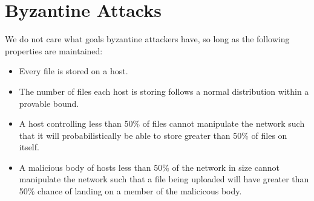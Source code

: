 \documentclass[twocolumn]{article}
\begin{document}
\section{Byzantine Attacks}
We do not care what goals byzantine attackers have, so long as the following properties are maintained:
\begin{itemize}
	\item Every file is stored on a host.
	\item The number of files each host is storing follows a normal distribution within a provable bound.
	\item A host controlling less than 50\% of files cannot manipulate the network such that it will probabilistically be able to store greater than 50\% of files on itself.
	\item A malicious body of hosts less than 50\% of the network in size cannot manipulate the network such that a file being uploaded will have greater than 50\% chance of landing on a member of the malicicous body.
\end{itemize}

\end{document}
